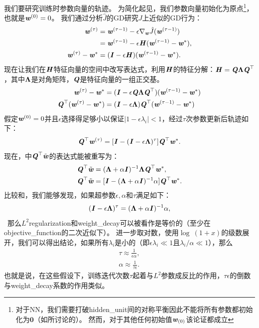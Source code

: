 我们要研究训练时参数向量的轨迹。
为简化起见，我们参数向量初始化为原点\footnote{对于\gls{NN}，我们需要打破\gls{hidden_unit}间的对称平衡因此不能将所有参数都初始化为$\mathbf{0}$（如所讨论的）。
然而，对于其他任何初始值$\Vw_{(0)}$该论证都成立}，也就是$\Vw^{(0)} = 0$。
我们通过分析$\hat{J}$的\gls{GD}研究$J$上近似的\gls{GD}行为：
\begin{align}
\Vw^{(\tau)} &= \Vw^{(\tau-1)} -\epsilon \nabla_{\Vw} \hat{J}( \Vw^{(\tau-1)} ) \\
&=  \Vw^{(\tau-1)}  - \epsilon  \MH ( \Vw^{(\tau-1)} -  \Vw^* ), \\
\Vw^{(\tau)}  -  \Vw^* &= (\MI - \epsilon  \MH) ( \Vw^{(\tau-1)} -  \Vw^* ).
 \end{align}
现在让我们在$\MH$特征向量的空间中改写表达式，利用$\MH$的特征分解：$\MH = \MQ \VLambda \MQ^\top$，其中$\VLambda$是对角矩阵，$\MQ$是特征向量的一组正交基。
\begin{align}
\Vw^{(\tau)}  -  \Vw^* &= (\MI - \epsilon \MQ \VLambda \MQ^\top) ( \Vw^{(\tau-1)} -  \Vw^* ) \\
\MQ^\top (\Vw^{(\tau)}  -  \Vw^*) &= (\MI - \epsilon \VLambda)\MQ^\top ( \Vw^{(\tau-1)} -  \Vw^* )
\end{align}
假定$\Vw^{(0)} = 0$并且$\epsilon$选择得足够小以保证$|1 - \epsilon \lambda_i |<1$，经过$\tau$次参数更新后轨迹如下：
\begin{align} \label{eq:740qw}
\MQ^\top  \Vw^{(\tau)} = [\MI - (\MI - \epsilon \VLambda)^\tau] \MQ^\top  \Vw^* .
\end{align}
现在，中$\MQ^\top \tilde \Vw$的表达式能被重写为：
\begin{align}
\MQ^\top  \tilde \Vw &= (\VLambda + \alpha \MI)^{-1} \VLambda \MQ^\top  \Vw^*, \\
\MQ^\top  \tilde \Vw &= [\MI - (\VLambda + \alpha \MI)^{-1} \alpha] \MQ^\top  \Vw^*. 
\label{eq:742qw}
\end{align}
比较和，我们能够发现，如果超参数$\epsilon,\alpha$和$\tau$满足如下：
\begin{align}
(\MI - \epsilon \VLambda)^\tau =  (\VLambda + \alpha \MI)^{-1} \alpha,
\end{align}\
那么$L^2$\gls{regularization}和\gls{weight_decay}可以被看作是等价的（至少在\gls{objective_function}的二次近似下）。
进一步取对数，使用$\log~(1+x)$的级数展开，我们可以得出结论，如果所有$\lambda_i$是小的（即$\epsilon \lambda_i \ll 1$且$\lambda_i / \alpha \ll 1$），那么
\begin{align}
\tau \approx \frac{1}{\epsilon \alpha}, \\
\alpha \approx \frac{1}{\tau \epsilon}.
\end{align}
也就是说，在这些假设下，训练迭代次数$\tau$起着与$L^2$参数成反比的作用，$\tau \epsilon$的倒数与\gls{weight_decay}系数的作用类似。

